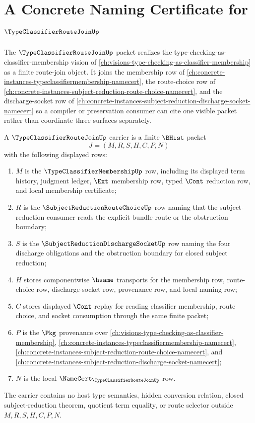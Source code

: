 \chapter{A Concrete Naming Certificate for $\TypeClassifierRouteJoinUp$}
\label{ch:concrete-instances-typeclassifierroutejoin-namecert}

The $\TypeClassifierRouteJoinUp$ packet realizes the type-checking-as-classifier-membership vision of \autoref{ch:visions-type-checking-as-classifier-membership} as a finite route-join object. It joins the membership row of \autoref{ch:concrete-instances-typeclassifiermembership-namecert}, the route-choice row of \autoref{ch:concrete-instances-subject-reduction-route-choice-namecert}, and the discharge-socket row of \autoref{ch:concrete-instances-subject-reduction-discharge-socket-namecert} so a compiler or preservation consumer can cite one visible packet rather than coordinate three surfaces separately.

\begin{definition}
\label{def:type-classifier-route-join-carrier}
A $\TypeClassifierRouteJoinUp$ carrier is a finite $\BHist$ packet
$$
J=(M,R,S,H,C,P,N)
$$
with the following displayed rows:
\begin{enumerate}
\item $M$ is the $\TypeClassifierMembershipUp$ row, including its displayed term history, judgment ledger, $\Ext$ membership row, typed $\Cont$ reduction row, and local membership certificate;
\item $R$ is the $\SubjectReductionRouteChoiceUp$ row naming that the subject-reduction consumer reads the explicit bundle route or the obstruction boundary;
\item $S$ is the $\SubjectReductionDischargeSocketUp$ row naming the four discharge obligations and the obstruction boundary for closed subject reduction;
\item $H$ stores componentwise $\hsame$ transports for the membership row, route-choice row, discharge-socket row, provenance row, and local naming row;
\item $C$ stores displayed $\Cont$ replay for reading classifier membership, route choice, and socket consumption through the same finite packet;
\item $P$ is the $\Pkg$ provenance over \autoref{ch:visions-type-checking-as-classifier-membership}, \autoref{ch:concrete-instances-typeclassifiermembership-namecert}, \autoref{ch:concrete-instances-subject-reduction-route-choice-namecert}, and \autoref{ch:concrete-instances-subject-reduction-discharge-socket-namecert};
\item $N$ is the local $\NameCert_{\TypeClassifierRouteJoinUp}$ row.
\end{enumerate}
The carrier contains no host type semantics, hidden conversion relation, closed subject-reduction theorem, quotient term equality, or route selector outside $M,R,S,H,C,P,N$.
\end{definition}

